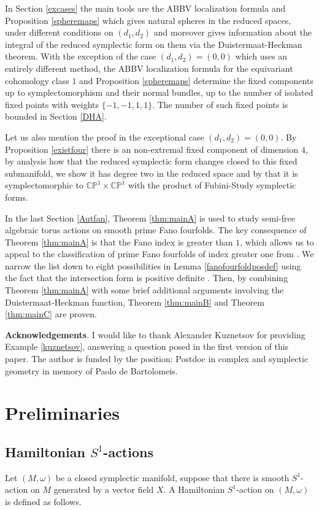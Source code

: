 \documentclass[12pt]{article}
\begin{document}
In Section \ref{excases} the main tools are the ABBV localization formula and Proposition \ref{spheremaps} which gives natural spheres in the reduced spaces, under different conditions on $(d_1,d_2)$ and moreover gives information about the integral of the reduced symplectic form on them via the Duistermaat-Heckman theorem. With the exception of the case $(d_1,d_2) =(0,0)$ which uses an entirely different method, the ABBV localization formula for the equivariant cohomology class $1$ and Proposition \ref{spheremaps} determine the fixed components up to symplectomorphism and their normal bundles, up to the number of isolated fixed points with weights $\{-1,-1,1,1\}$. The number of such fixed points is bounded in Section \ref{DHA}.

Let us also mention the proof in the exceptional case  $(d_1,d_2) =(0,0)$. By Proposition \ref{existfour} there is an non-extremal fixed component of dimension $4$, by analysis how that the reduced symplectic form changes closed to this fixed submanifold, we show it has degree two in the reduced space and by \cite{H} that it is symplectomorphic to $\mathbb{CP}^1 \times \mathbb{CP}^1$ with the product of Fubini-Study symplectic forms.   

In the last Section \ref{Autfan}, Theorem \ref{thm:mainA} is used to study semi-free algebraic torus actions on smooth prime Fano fourfolds. The key consequence of Theorem \ref{thm:mainA}  is that the Fano index is greater than $1$, which allows us to appeal to the classification of prime Fano fourfolds of index greater one from \cite{Mu,W}. We narrow the list down to eight possibilities in Lemma \ref{fanofourfoldposdef} using the fact that the intersection form is positive definite \cite[Theorem 3.4]{L}. Then, by combining Theorem \ref{thm:mainA} with some brief additional arguments involving the Duistermaat-Heckman function, Theorem  \ref{thm:mainB} and Theorem  \ref{thm:mainC} are proven. 

\textbf{Acknowledgements}. I would like to thank Alexander Kuznetsov for providing Example \ref{kuznetsov}, answering a question posed in the first version of this paper. The author is funded by the position: Postdoc in complex and symplectic geometry in memory of Paolo de Bartolomeis. 
\section{Preliminaries}
\subsection{Hamiltonian $S^1$-actions}
Let $(M,\omega)$ be a closed symplectic manifold, suppose that there is smooth $S^1$-action on $M$ generated by a vector field $X$.  A Hamiltonian $S^1$-action on  $(M,\omega)$ is defined as follows.
\end{document}
